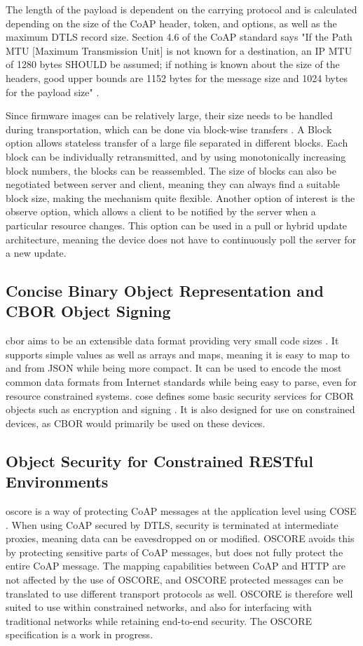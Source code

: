 \documentclass[0-thesis.tex]{subfiles}
\begin{document}
The length of the payload is dependent on the carrying protocol and is calculated
depending on the size of the CoAP header, token, and options, as well as the maximum DTLS
record size. Section 4.6 of the CoAP standard says "If the Path MTU [Maximum Transmission
Unit] is not known for a destination, an IP MTU of 1280 bytes SHOULD be assumed; if
nothing is known about the size of the headers, good upper bounds are 1152 bytes for the
message size and 1024 bytes for the payload size" \parencite{rfc7252}.

Since firmware images can be relatively large, their size needs to be handled during
transportation, which can be done via block-wise transfers \parencite{rfc7959}. A Block
option allows stateless transfer of a large file separated in different blocks. Each block
can be individually retransmitted, and by using monotonically increasing block numbers, the
blocks can be reassembled. The size of blocks can also be negotiated between server and
client, meaning they can always find a suitable block size, making the mechanism quite
flexible. Another option of interest is the observe option, which allows a client to be
notified by the server when a particular resource changes. This option can be used in a
pull or hybrid update architecture, meaning the device does not have to continuously poll
the server for a new update.

\subsection{Concise Binary Object Representation and CBOR Object Signing}
\label{ssec:cbor-and-cose}
\gls{cbor} aims to be an extensible data format providing very small code sizes
\parencite{rfc7049}. It supports simple values as well as arrays and maps, meaning it is
easy to map to and from JSON while being more compact. It can be used to encode the most
common data formats from Internet standards while being easy to parse, even for resource
constrained systems. \gls{cose} defines some basic security services for CBOR objects such
as encryption and signing \parencite{rfc8152}. It is also designed for use on
constrained devices, as CBOR would primarily be used on these devices.

\subsection{Object Security for Constrained RESTful Environments}
\label{ssec:oscore}
\gls{oscore} is a way of protecting CoAP messages at the application level using COSE
\parencite{oscore}. When using CoAP secured by DTLS, security is terminated at
intermediate proxies, meaning data can be eavesdropped on or modified. OSCORE avoids this
by protecting sensitive parts of CoAP messages, but does not fully protect the entire CoAP
message. The mapping capabilities between CoAP and HTTP are not affected by the use of
OSCORE, and OSCORE protected messages can be translated to use different transport
protocols as well. OSCORE is therefore well suited to use within constrained networks, and
also for interfacing with traditional networks while retaining end-to-end security. The
OSCORE specification is a work in progress.
\end{document}
